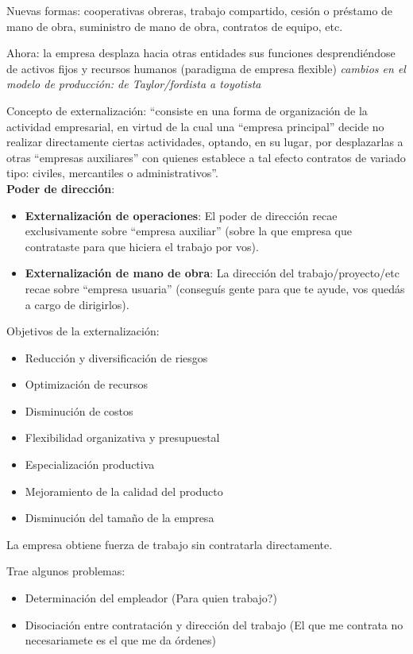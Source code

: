 \documentclass[spanish,12pt,a4paper,titlepage]{report}
\begin{document}
Nuevas formas: cooperativas obreras, trabajo compartido, cesión o préstamo de mano de obra, suministro de mano de obra, contratos de equipo, etc.

Ahora: la empresa desplaza hacia otras entidades sus funciones desprendiéndose de activos fijos y recursos humanos (paradigma de empresa flexible) \textit{cambios en el modelo de producción: de Taylor/fordista a toyotista}

Concepto de externalización: “consiste en una forma de organización de la actividad empresarial, en virtud de la cual una “empresa principal” decide no realizar directamente ciertas actividades, optando, en su lugar, por desplazarlas a otras “empresas auxiliares” con quienes establece a tal efecto contratos de variado tipo: civiles, mercantiles o administrativos”.\\

\textbf{Poder de dirección}:
\begin{itemize}
\item \textbf{Externalización de operaciones}: El poder de dirección recae exclusivamente sobre “empresa auxiliar” (sobre la que empresa que contrataste para que hiciera el trabajo por vos).
\item \textbf{Externalización de mano de obra}: La dirección del trabajo/proyecto/etc recae sobre “empresa usuaria” (conseguís gente para que te ayude, vos quedás a cargo de dirigirlos).
\end{itemize}
 
Objetivos de la externalización: 
\begin{itemize}
\item Reducción y diversificación de riesgos
\item Optimización de recursos 
\item Disminución de costos 
\item Flexibilidad organizativa y presupuestal
\item Especialización productiva
\item Mejoramiento de la calidad del producto
\item Disminución del tamaño de la empresa
\end{itemize}

La empresa obtiene fuerza de trabajo sin contratarla directamente.

Trae algunos problemas:
\begin{itemize}
\item Determinación del empleador (Para quien trabajo?)
\item Disociación entre contratación y dirección del trabajo (El que me contrata no necesariamete es el que me da órdenes)
\end{itemize}
\end{document}

